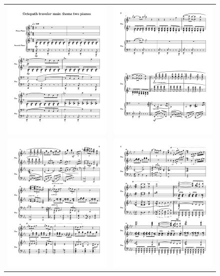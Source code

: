 \documentclass[12pt]{article}
\begin{document}
\iffalse
\pagebreak

\begin{figure}[H]
\centering
\begin{tabular}{cc}
\includegraphics[width=.4\linewidth, trim=30 100 30 20, clip]{octopathscore/octopathscore1024_1.png} &
\includegraphics[width=0.4\linewidth, trim=30 100 30 20, clip]{octopathscore/octopathscore1024_2.png} \\
\includegraphics[width=0.4\linewidth, trim=30 100 30 20, clip]{octopathscore/octopathscore1024_3.png} &
\includegraphics[width=0.4\linewidth, trim=30 100 30 20, clip]{octopathscore/octopathscore1024_4.png}

\end{tabular}
\end{figure}
\end{document}

